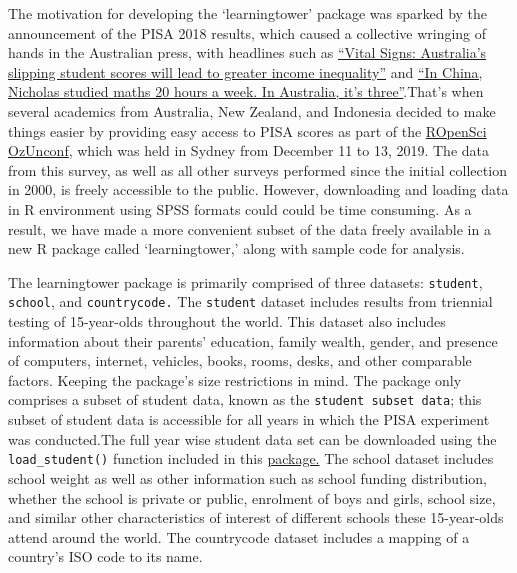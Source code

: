 The motivation for developing the `learningtower' package was sparked by
the announcement of the PISA 2018 results, which caused a collective
wringing of hands in the Australian press, with headlines such as
\href{https://theconversation.com/vital-signs-australias-slipping-student-scores-will-lead-to-greater-income-inequality-128301}{``Vital
Signs: Australia's slipping student scores will lead to greater income
inequality''} and
\href{https://www.smh.com.au/education/in-china-nicholas-studied-maths-20-hours-a-week-in-australia-it-s-three-20191203-p53ggv.html}{``In
China, Nicholas studied maths 20 hours a week. In Australia, it's
three''}.That's when several academics from Australia, New Zealand, and
Indonesia decided to make things easier by providing easy access to PISA
scores as part of the \href{https://ozunconf19.ropensci.org/}{ROpenSci
OzUnconf}, which was held in Sydney from December 11 to 13, 2019. The
data from this survey, as well as all other surveys performed since the
initial collection in 2000, is freely accessible to the public. However,
downloading and loading data in R environment using SPSS formats could
could be time consuming. As a result, we have made a more convenient
subset of the data freely available in a new R package called
`learningtower,' along with sample code for analysis.

The learningtower package is primarily comprised of three datasets:
\texttt{student}, \texttt{school}, and \texttt{countrycode.} The
\texttt{student} dataset includes results from triennial testing of
15-year-olds throughout the world. This dataset also includes
information about their parents' education, family wealth, gender, and
presence of computers, internet, vehicles, books, rooms, desks, and
other comparable factors. Keeping the package's size restrictions in
mind. The package only comprises a subset of student data, known as the
\texttt{student\ subset\ data}; this subset of student data is
accessible for all years in which the PISA experiment was conducted.The
full year wise student data set can be downloaded using the
\texttt{load\_student()} function included in this
\href{https://kevinwang09.github.io/learningtower/}{package.} The school
dataset includes school weight as well as other information such as
school funding distribution, whether the school is private or public,
enrolment of boys and girls, school size, and similar other
characteristics of interest of different schools these 15-year-olds
attend around the world. The countrycode dataset includes a mapping of a
country's ISO code to its name.

